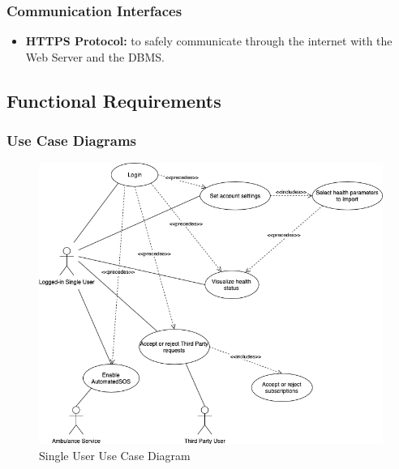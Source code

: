 \documentclass[titlepage]{article}
\begin{document}
		\subsubsection{Communication Interfaces}
		\begin{itemize}
			\item {\bf HTTPS Protocol:} to safely communicate through the internet with the Web Server and the DBMS.

		\end{itemize}

	\subsection{Functional Requirements}
			
		\subsubsection{Use Case Diagrams}
			
		\begin{figure}[ht]
  			\includegraphics[width=\linewidth]{Diagrammi/SingleUserUseCase.png}
  			\caption{Single User Use Case Diagram}
 			 \label{fig:SingleUserUseCase}
		\end{figure}
			
\end{document}

